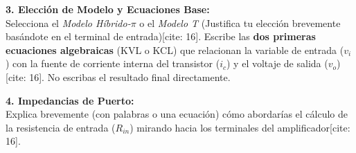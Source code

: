 \documentclass[11pt, a4paper]{article}
\begin{document}
\vspace{0.5cm}
\textbf{3. Elección de Modelo y Ecuaciones Base:} \\
Selecciona el \textit{Modelo Híbrido-$\pi$} o el \textit{Modelo T} (Justifica tu elección brevemente basándote en el terminal de entrada)[cite: 16]. Escribe las \textbf{dos primeras ecuaciones algebraicas} (KVL o KCL) que relacionan la variable de entrada ($v_i$) con la fuente de corriente interna del transistor ($i_c$) y el voltaje de salida ($v_o$)[cite: 16]. No escribas el resultado final directamente.
\vspace{4cm}

\textbf{4. Impedancias de Puerto:} \\
Explica brevemente (con palabras o una ecuación) cómo abordarías el cálculo de la resistencia de entrada ($R_{in}$) mirando hacia los terminales del amplificador[cite: 16].
\vspace{2cm}
\end{document}
